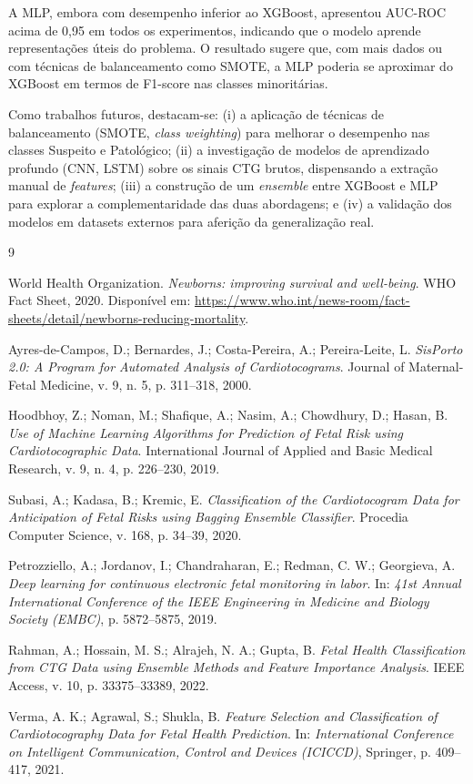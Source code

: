 \documentclass[12pt, a4paper]{article}
\begin{document}
A MLP, embora com desempenho inferior ao XGBoost, apresentou AUC-ROC acima de 0,95 em todos
os experimentos, indicando que o modelo aprende representações úteis do problema. O resultado
sugere que, com mais dados ou com técnicas de balanceamento como SMOTE, a MLP poderia se
aproximar do XGBoost em termos de F1-score nas classes minoritárias.

Como trabalhos futuros, destacam-se: (i) a aplicação de técnicas de balanceamento
(SMOTE, \textit{class weighting}) para melhorar o desempenho nas classes Suspeito e Patológico;
(ii) a investigação de modelos de aprendizado profundo (CNN, LSTM) sobre os sinais CTG brutos,
dispensando a extração manual de \textit{features}; (iii) a construção de um \textit{ensemble}
entre XGBoost e MLP para explorar a complementaridade das duas abordagens; e (iv) a validação
dos modelos em datasets externos para aferição da generalização real.


\begin{thebibliography}{9}

World Health Organization.
\textit{Newborns: improving survival and well-being}.
WHO Fact Sheet, 2020.
Disponível em: \url{https://www.who.int/news-room/fact-sheets/detail/newborns-reducing-mortality}.

Ayres-de-Campos, D.; Bernardes, J.; Costa-Pereira, A.; Pereira-Leite, L.
\textit{SisPorto 2.0: A Program for Automated Analysis of Cardiotocograms}.
Journal of Maternal-Fetal Medicine, v. 9, n. 5, p. 311--318, 2000.

Hoodbhoy, Z.; Noman, M.; Shafique, A.; Nasim, A.; Chowdhury, D.; Hasan, B.
\textit{Use of Machine Learning Algorithms for Prediction of Fetal Risk using Cardiotocographic Data}.
International Journal of Applied and Basic Medical Research, v. 9, n. 4, p. 226--230, 2019.

Subasi, A.; Kadasa, B.; Kremic, E.
\textit{Classification of the Cardiotocogram Data for Anticipation of Fetal Risks using Bagging Ensemble Classifier}.
Procedia Computer Science, v. 168, p. 34--39, 2020.

Petrozziello, A.; Jordanov, I.; Chandraharan, E.; Redman, C. W.; Georgieva, A.
\textit{Deep learning for continuous electronic fetal monitoring in labor}.
In: \textit{41st Annual International Conference of the IEEE Engineering in Medicine and Biology Society (EMBC)}, p. 5872--5875, 2019.

Rahman, A.; Hossain, M. S.; Alrajeh, N. A.; Gupta, B.
\textit{Fetal Health Classification from CTG Data using Ensemble Methods and Feature Importance Analysis}.
IEEE Access, v. 10, p. 33375--33389, 2022.

Verma, A. K.; Agrawal, S.; Shukla, B.
\textit{Feature Selection and Classification of Cardiotocography Data for Fetal Health Prediction}.
In: \textit{International Conference on Intelligent Communication, Control and Devices (ICICCD)},
Springer, p. 409--417, 2021.

\end{thebibliography}
\end{document}
